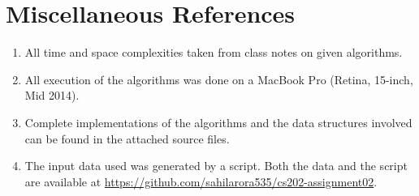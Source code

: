 \documentclass[12pt]{article}
\begin{document}
	\section*{Miscellaneous References}
		\begin{enumerate}
			\item All time and space complexities taken from class notes on given algorithms.
			\item All execution of the algorithms was done on a MacBook Pro (Retina, 15-inch, Mid 2014).
			\item Complete implementations of the algorithms and the data structures involved can be found in the attached source files.
			\item The input data used was generated by a script. Both the data and the script are available at \url{https://github.com/sahilarora535/cs202-assignment02}.
		\end{enumerate}				
\end{document}
